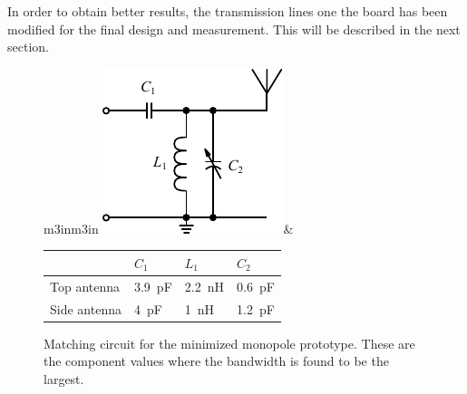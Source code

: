 In order to obtain better results, the transmission lines one the board has been modified for the final design and measurement. This will be described in the next section.

\begin{figure}[htbp]
        \centering
        \begin{tabular}{m{3in}m{3in}}
            \centering
            \includegraphics{img/tech_sol/schematic_tuning_1}&
            \centering
            \footnotesize
            \begin{tabular}{|l|l|l|l|}
                \hline
                & $C_1$ & $L_1$ & $C_2$ \\
                \hline
              Top antenna & \SI{3.9}{pF} & \SI{2.2}{nH} & \SI{0.6}{pF} \\
              Side antenna & \SI{4}{pF} & \SI{1}{nH} & \SI{1.2}{pF} \\
                \hline
            \end{tabular}
        \end{tabular}
    \caption{Matching circuit for the minimized monopole prototype. These are the component values where the bandwidth is found to be the largest.}
    \label{fig:mono_matching_modi_meas}
\end{figure}

